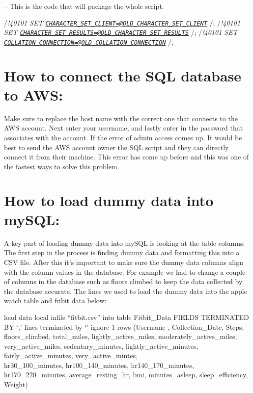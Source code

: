 \documentclass[]{book}
\begin{document}
-- This is the code that will package the whole script.

/\emph{!40101 SET \href{mailto:CHARACTER_SET_CLIENT=@OLD_CHARACTER_SET_CLIENT}{\nolinkurl{CHARACTER\_SET\_CLIENT=@OLD\_CHARACTER\_SET\_CLIENT}} }/;
/\emph{!40101 SET \href{mailto:CHARACTER_SET_RESULTS=@OLD_CHARACTER_SET_RESULTS}{\nolinkurl{CHARACTER\_SET\_RESULTS=@OLD\_CHARACTER\_SET\_RESULTS}} }/;
/\emph{!40101 SET \href{mailto:COLLATION_CONNECTION=@OLD_COLLATION_CONNECTION}{\nolinkurl{COLLATION\_CONNECTION=@OLD\_COLLATION\_CONNECTION}} }/;

\hypertarget{how-to-connect-the-sql-database-to-aws}{%
\section{How to connect the SQL database to AWS:}\label{how-to-connect-the-sql-database-to-aws}}

Make sure to replace the host name with the correct one that connects to the AWS account. Next enter your username, and lastly enter in the password that associates with the account. If the error of admin access comes up. It would be best to send the AWS account owner the SQL script and they can directly connect it from their machine. This error has come up before and this was one of the fastest ways to solve this problem.

\hypertarget{how-to-load-dummy-data-into-mysql}{%
\section{How to load dummy data into mySQL:}\label{how-to-load-dummy-data-into-mysql}}

A key part of loading dummy data into mySQL is looking at the table columns. The first step in the process is finding dummy data and formatting this into a CSV file. After this it's important to make sure the dummy data columns align with the column values in the database. For example we had to change a couple of columns in the database such as floors climbed to keep the data collected by the database accurate. The lines we used to load the dummy data into the apple watch table and fitbit data below:

load data local infile ``fitbit.csv'' into table Fitbit\_Data
FIELDS TERMINATED BY `,'
lines terminated by `\n'
ignore 1 rows
(Username , Collection\_Date, Steps, floors\_climbed, total\_miles, lightly\_active\_miles,
moderately\_active\_miles, very\_active\_miles, sedentary\_minutes,
lightly\_active\_minutes, fairly\_active\_minutes,
very\_active\_mintes,\\
hr30\_100\_minutes,
hr100\_140\_minutes, hr140\_170\_minutes, hr170\_220\_minutes, average\_resting\_hr, bmi, minutes\_asleep, sleep\_efficiency, Weight)
\end{document}
